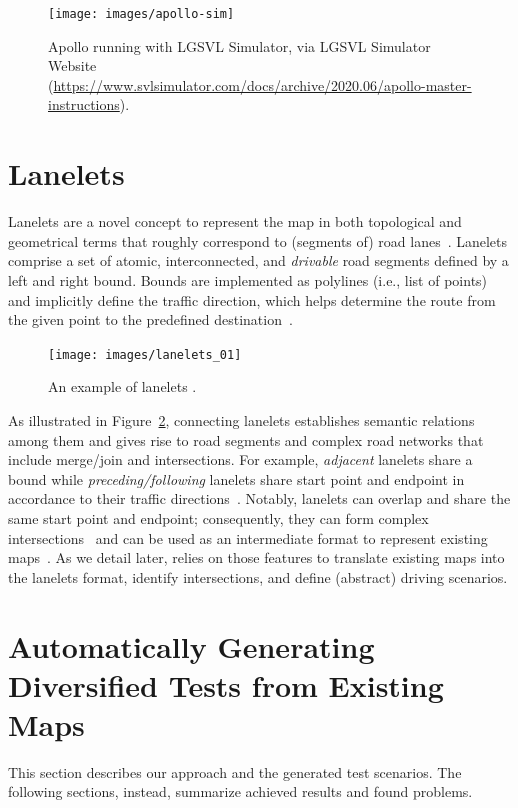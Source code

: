 \documentclass[conference]{IEEEtran}
\begin{document}
\begin{figure}[tp]
  \centering
    \texttt{[image: images/apollo-sim]}
  \caption{
    Apollo running with LGSVL Simulator, via LGSVL Simulator Website (\href{https://www.svlsimulator.com/docs/archive/2020.06/apollo-master-instructions}{https://www.svlsimulator.com/docs/archive/2020.06/apollo-master-instructions}).
    }
  \label{fig:apollosim}
\end{figure}


\section{Lanelets}
\label{subsect:lanelets}
Lanelets are a novel concept to represent the map in both topological and geometrical terms that roughly correspond to (segments of) road lanes~\cite{bender2014lanelets}. Lanelets comprise a set of atomic, interconnected, and \emph{drivable} road segments defined by a left and right bound. Bounds are implemented as polylines (i.e., list of points) and implicitly define the traffic direction, which helps determine the route from the given point to the predefined destination~\cite{PekIV20}.

\begin{figure}[H]
  \centering
    \texttt{[image: images/lanelets\_01]}
  \caption{An example of lanelets \cite{althoff2018automatic}.}
  \label{fig:lanelets}
\end{figure}

As illustrated in Figure~\ref{fig:lanelets}, connecting lanelets establishes semantic relations among them and gives rise to road segments and complex road networks that include merge/join and intersections. For example, \emph{adjacent} lanelets share a bound while \emph{preceding/following} lanelets share start point and endpoint in accordance to their traffic directions~\cite{althoff2018automatic}. Notably, lanelets can overlap and share the same start point and endpoint; consequently, they can form complex intersections~\cite{Althoff2017a} and can be used as an intermediate format to represent existing maps~\cite{althoff2018automatic}.
%
As we detail later, \tool relies on those features to translate existing maps into the lanelets format, identify intersections, and define (abstract) driving scenarios.

\section{Automatically Generating Diversified Tests from Existing Maps}
This section describes our approach and the generated test scenarios. The following sections, instead, summarize achieved results and found problems.
\end{document}
